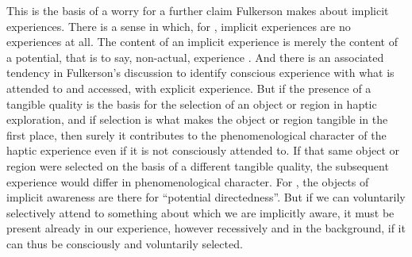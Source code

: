 This is the basis of a worry for a further claim Fulkerson makes about implicit experiences. There is a sense in which, for \citet[91]{Fulkerson:2014ek}, implicit experiences are no experiences at all. The content of an implicit experience is merely the content of a potential, that is to say, non-actual, experience \citep[95]{Fulkerson:2014ek}. And there is an associated tendency in Fulkerson's discussion to identify conscious experience with what is attended to and accessed, with explicit experience. But if the presence of a tangible quality is the basis for the selection of an object or region in haptic exploration, and if selection is what makes the object or region tangible in the first place, then surely it contributes to the phenomenological character of the haptic experience even if it is not consciously attended to. If that same object or region were selected on the basis of a different tangible quality, the subsequent experience would differ in phenomenological character. For \citet[95]{Fulkerson:2014ek}, the objects of implicit awareness are there for ``potential directedness''. But if we can voluntarily selectively attend to something about which we are implicitly aware, it must be present already in our experience, however recessively and in the background, if it can thus be consciously and voluntarily selected.

